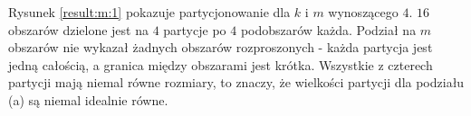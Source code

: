Rysunek \ref{result:m:1} pokazuje partycjonowanie dla $k$ i $m$ wynoszącego $4$.
$16$ obszarów dzielone jest na $4$ partycje po $4$ podobszarów każda.
Podział na $m$ obszarów nie wykazał żadnych obszarów rozproszonych - każda partycja jest jedną całością,
a granica między obszarami jest krótka.
Wszystkie z czterech partycji mają niemal równe rozmiary, to znaczy, że wielkości partycji dla podziału (a) są
niemal idealnie równe.
\begin{figure}[h]
\centering
\begin{subfigure}{.33\textwidth}
    \centering
    \caption[short]{}
\end{subfigure}%
\begin{subfigure}{.33\textwidth}
    \centering

\end{subfigure}
\end{figure}
